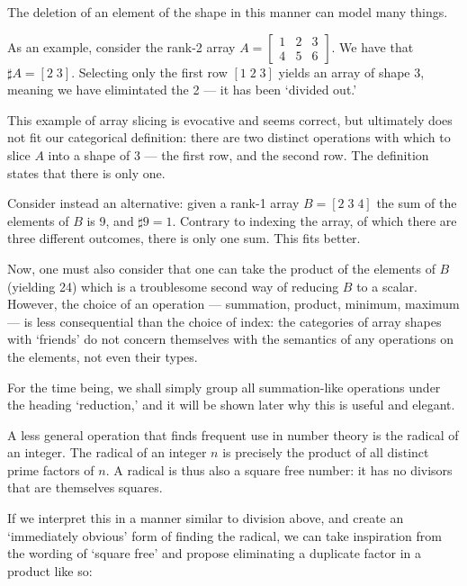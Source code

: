 \documentclass{DIKU-report-variant}
\begin{document}
The deletion of an element of the shape in this manner can model many things.

As an example,
consider the rank-2 array \(A = \left[\begin{smallmatrix} 1 & 2 & 3 \\ 4 & 5 & 6 \end{smallmatrix}\right]\).
We have that \(\sharp A = [2\; 3]\). Selecting only the first row \([1\;2\;3]\) yields an array of shape 3,
meaning we have elimintated the 2 --- it has been `divided out.'

This example of array slicing is evocative and seems correct, but ultimately does not fit our categorical
definition: there are two distinct operations with which to slice \(A\) into a shape of 3 --- the first row,
and the second row. The definition states that there is only one.

Consider instead an alternative: given a rank-1 array \(B = [2\;3\;4]\) the sum of the
elements of \(B\) is 9, and \(\sharp 9 = 1\). Contrary to indexing the array, of which there are
three different outcomes, there is only one sum. This fits better.

Now, one must also consider that one can take the product of the elements of \(B\) (yielding 24) which
is a troublesome second way of reducing \(B\) to a scalar. However, the choice of an operation --- summation,
product, minimum, maximum --- is less consequential than the choice of index: the categories of
array shapes with `friends' do not concern themselves with the semantics of any operations on the elements,
not even their types.

For the time being, we shall simply group all summation-like operations under the heading `reduction,' and
it will be shown later why this is useful and elegant.

A less general operation that finds frequent use in number theory is the radical of an integer. The
radical of an integer \(n\) is precisely the product of all distinct prime factors of \(n\). A radical
is thus also a square free number: it has no divisors that are themselves squares.

If we interpret this in a manner similar to division above, and create an `immediately obvious' form
of finding the radical, we can take inspiration from the wording of `square free' and propose eliminating
a duplicate factor in a product like so:
\end{document}
